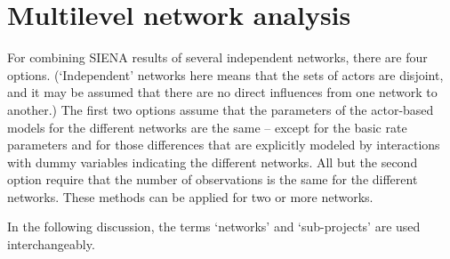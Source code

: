 \documentclass[a4paper,fleqn,11pt]{article}
\newcommand{\+}{\, + \,}
\newcommand{\SI}{{\sf SIENA }}
\begin{document}
\newpage
\section{Multilevel network analysis}
\label{S_mulev}

For combining \SI results of several independent networks,
there are four options.
(`Independent'  networks here means that the sets of actors are
disjoint, and it may be assumed that there are no direct influences
from one network to another.)
The first two options assume that the parameters
of the actor-based models for the different
networks are the same -- except
for the basic rate parameters and for
those differences that are explicitly modeled by interactions
with dummy variables indicating the different networks.
All but the second option require that the number of observations
is the same for the different networks.
These methods can be applied for two or more networks.
\medskip

In the following discussion, 
the terms `networks' and `sub-projects' are used interchangeably.
\end{document}
